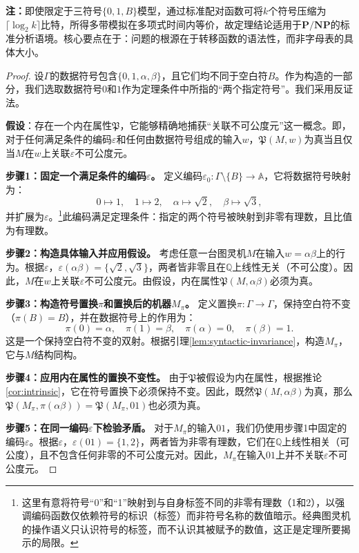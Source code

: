 \documentclass{ctexart}
\newtheorem{proof}[theorem]{证明}
\begin{document}
	\noindent\textbf{注：}即使限定于三符号$\{0,1,B\}$模型，通过标准配对函数可将$k$个符号压缩为$\lceil\log_2 k\rceil$比特，所得多带模拟在多项式时间内等价，故定理结论适用于$\mathbf{P}/\mathbf{NP}$的标准分析语境。核心要点在于：问题的根源在于转移函数的语法性，而非字母表的具体大小。
	
	\begin{proof}
		设$\Gamma$的数据符号包含$\{0, 1, \alpha, \beta\}$，且它们均不同于空白符$B$。作为构造的一部分，我们选取数据符号$0$和$1$作为定理条件中所指的``两个指定符号''。我们采用反证法。
		
		\textbf{假设}：存在一个内在属性$\mathfrak{P}$，它能够精确地捕获``关联不可公度元''这一概念。即，对于任何满足条件的编码$\varepsilon$和任何由数据符号组成的输入$w$，$\mathfrak{P}(M, w)$为真当且仅当$M$在$w$上关联$\varepsilon$不可公度元。
		
		\textbf{步骤1：固定一个满足条件的编码$\varepsilon$。}
		定义编码$\varepsilon_0: \Gamma \setminus \{B\} \to \mathbb{A}$，它将数据符号映射为：
		\[
		0 \mapsto 1,\quad 1 \mapsto 2,\quad \alpha \mapsto \sqrt{2},\quad \beta \mapsto \sqrt{3},
		\]
		并扩展为$\varepsilon$。\footnote{这里有意将符号``0''和``1''映射到与自身标签不同的非零有理数（1和2），以强调编码函数仅依赖符号的标识（标签）而非符号名称的数值暗示。经典图灵机的操作语义只认识符号的标签，而不认识其被赋予的数值，这正是定理所要揭示的局限。}此编码满足定理条件：指定的两个符号被映射到非零有理数，且比值为有理数。
		
		\textbf{步骤2：构造具体输入并应用假设。}
		考虑任意一台图灵机$M$在输入$w = \alpha\beta$上的行为。根据$\varepsilon$，$\varepsilon(\alpha\beta) = \{\sqrt{2}, \sqrt{3}\}$，两者皆非零且在$\mathbb{Q}$上线性无关（不可公度）。因此，$M$在$w$上关联$\varepsilon$不可公度元。由假设，内在属性$\mathfrak{P}(M, \alpha\beta)$必须为真。
		
		\textbf{步骤3：构造符号置换$\pi$和置换后的机器$M_\pi$。}
		定义置换$\pi: \Gamma \to \Gamma$，保持空白符不变（$\pi(B)=B$），并在数据符号上的作用为：
		\[
		\pi(0) = \alpha,\quad \pi(1) = \beta,\quad \pi(\alpha) = 0,\quad \pi(\beta) = 1.
		\]
		这是一个保持空白符不变的双射。根据引理\ref{lem:syntactic-invariance}，构造$M_\pi$，它与$M$结构同构。
		
		\textbf{步骤4：应用内在属性的置换不变性。}
		由于$\mathfrak{P}$被假设为内在属性，根据推论\ref{cor:intrinsic}，它在符号置换下必须保持不变。因此，既然$\mathfrak{P}(M, \alpha\beta)$为真，那么$\mathfrak{P}(M_\pi, \pi(\alpha\beta)) = \mathfrak{P}(M_\pi, 01)$也必须为真。
		
		\textbf{步骤5：在同一编码$\varepsilon$下检验矛盾。}
		对于$M_\pi$的输入$01$，我们仍使用步骤1中固定的编码$\varepsilon$。根据$\varepsilon$，$\varepsilon(0 1) = \{1, 2\}$，两者皆为非零有理数，它们在$\mathbb{Q}$上线性相关（可公度），且不包含任何非零的不可公度元对。因此，$M_\pi$在输入$01$上并不关联$\varepsilon$不可公度元。
		

\end{proof}
\end{document}
